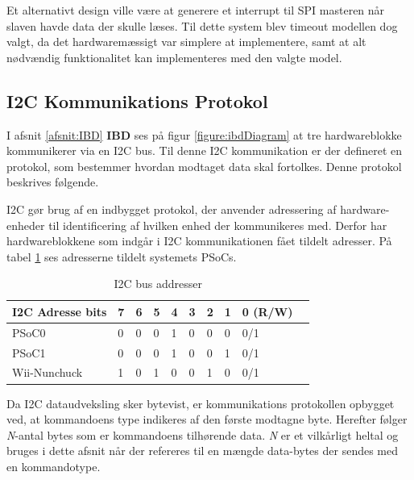 Et alternativt design ville være at generere et interrupt til SPI masteren når slaven havde data der skulle læses. Til dette system blev timeout modellen dog valgt, da det hardwaremæssigt var simplere at implementere, samt at alt nødvændig funktionalitet kan implementeres med den valgte model.

\subsection{I2C Kommunikations Protokol}
\label{afsnit:I2CProtokol}
I afsnit \ref{afsnit:IBD} \textbf{IBD} ses på figur \ref{figure:ibdDiagram} at tre hardwareblokke kommunikerer via en I2C bus. Til denne I2C kommunikation er der defineret en protokol, som bestemmer hvordan modtaget data skal fortolkes. Denne protokol beskrives følgende.

I2C gør brug af en indbygget protokol, der anvender adressering af hardware-enheder til identificering af hvilken enhed der kommunikeres med. Derfor har hardwareblokkene som indgår i I2C kommunikationen fået tildelt adresser. På tabel \ref{table:I2CAddress} ses adresserne tildelt systemets PSoCs.

\begin{table}[H]
	\centering
	\begin{tabular}{llllllllll}
		\hline
		\multicolumn{1}{|l|}{I2C Adresse bits} & 7                        & 6                        & 5                        & 4 & 3 & 2 & \multicolumn{1}{l|}{1} & \multicolumn{1}{l|}{0 (R/W)} \\ \hline
		\rowcolor[HTML]{CBCEFB} 
		{\color[HTML]{000000} PSoC0}           & {\color[HTML]{000000} 0} & {\color[HTML]{000000} 0} & {\color[HTML]{000000} 0} & 1 & 0 & 0 & 0                      & 0/1                          \\
		PSoC1                                  & 0                        & 0                        & 0                        & 1 & 0 & 0 & 1                      & 0/1 \\
		\rowcolor[HTML]{CBCEFB} 
		{\color[HTML]{000000} Wii-Nunchuck}           & {\color[HTML]{000000} 1} & {\color[HTML]{000000} 0} & {\color[HTML]{000000} 1} & 0 & 0 & 1 & 0                      & 0/1                      
	\end{tabular}
	\caption{I2C bus addresser}
	\label{table:I2CAddress}
\end{table}

Da I2C dataudveksling sker bytevist, er kommunikations protokollen opbygget ved, at kommandoens type indikeres af den første modtagne byte. Herefter følger \textit{N}-antal bytes som er kommandoens tilhørende data. \textit{N} er et vilkårligt heltal og bruges i dette afsnit når der refereres til en mængde data-bytes der sendes med en kommandotype.

